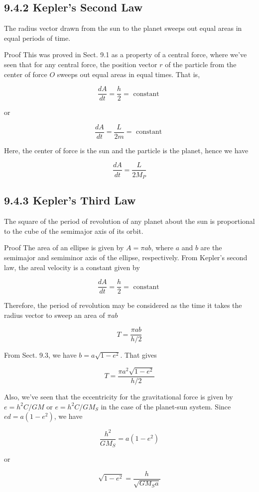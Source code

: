 \documentclass[10pt]{article}
\begin{document}
\subsection*{9.4.2 Kepler's Second Law}
The radius vector drawn from the sun to the planet sweeps out equal areas in equal periods of time.

Proof This was proved in Sect. 9.1 as a property of a central force, where we've seen that for any central force, the position vector $r$ of the particle from the center of force $O$ sweeps out equal areas in equal times. That is,

$$
\frac{d A}{d t}=\frac{h}{2}=\text { constant }
$$

or

$$
\frac{d A}{d t}=\frac{L}{2 m}=\text { constant }
$$

Here, the center of force is the sun and the particle is the planet, hence we have

$$
\frac{d A}{d t}=\frac{L}{2 M_{P}}
$$

\subsection*{9.4.3 Kepler's Third Law}
The square of the period of revolution of any planet about the sun is proportional to the cube of the semimajor axis of its orbit.

Proof The area of an ellipse is given by $A=\pi a b$, where $a$ and $b$ are the semimajor and semiminor axis of the ellipse, respectively. From Kepler's second law, the areal velocity is a constant given by

$$
\frac{d A}{d t}=\frac{h}{2}=\text { constant }
$$

Therefore, the period of revolution may be considered as the time it takes the radius vector to sweep an area of $\pi a b$

$$
T=\frac{\pi a b}{h / 2}
$$

From Sect. 9.3, we have $b=a \sqrt{1-e^{2}}$. That gives

$$
T=\frac{\pi a^{2} \sqrt{1-e^{2}}}{h / 2}
$$

Also, we've seen that the eccentricity for the gravitational force is given by $e=h^{2} C / G M$ or $e=h^{2} C / G M_{S}$ in the case of the planet-sun system. Since $e d=a\left(1-e^{2}\right)$, we have

$$
\frac{h^{2}}{G M_{S}}=a\left(1-e^{2}\right)
$$

or

$$
\sqrt{1-e^{2}}=\frac{h}{\sqrt{G M_{S} a}}
$$
\end{document}
